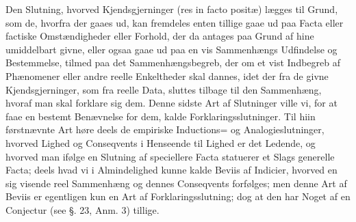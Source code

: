\documentclass[12pt]{book}
\def\textit#1{#1}%
\def\emph#1{#1}%
\newcommand{\opage}[1]{\marginnote{\footnotesize\textit{[#1]}}}
\begin{document}
Den Slutning, hvorved \emph{Kjendsgjerninger} (\textit{res in facto positæ})
lægges til Grund, som de, hvorfra der gaaes ud, kan fremdeles enten tillige
gaae ud paa \emph{Facta} eller factiske Omstændigheder eller Forhold, der da
antages paa Grund af hine umiddelbart givne, eller ogsaa gaae ud paa en vis
Sammenhængs Udfindelse og Bestemmelse, tilmed paa det Sammenhængsbegreb, der om
et vist Indbegreb af Phænomener eller andre reelle Enkeltheder skal dannes,
idet der fra de givne Kjendsgjerninger, som fra
\opage{351} reelle \emph{Data}, sluttes tilbage til den Sammenhæng, hvoraf man skal
forklare sig dem. Denne sidste Art af Slutninger ville vi, for at faae en
bestemt Benævnelse for dem, kalde \emph{Forklaringsslutninger}. Til hiin
førstnævnte Art høre deels de empiriske \emph{Inductions=} og
\emph{Analogieslutninger}, hvorved Lighed og Conseqvents i Henseende til Lighed
er det Ledende, og hvorved man ifølge en Slutning af speciellere \emph{Facta}
statuerer et Slags generelle \emph{Facta}; deels hvad vi i Almindelighed kunne
kalde Beviis af \emph{Indicier}, hvorved en sig visende reel Sammenhæng og
dennes Conseqvents forfølges; men denne Art af Beviis er egentligen kun en Art
af Forklaringsslutning; dog at den har Noget af en Conjectur (see §. 23, Anm.
3) tillige.
\end{document}
